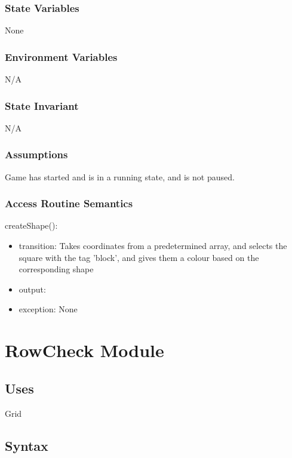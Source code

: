 \documentclass[12pt]{article}
\begin{document}
\subsubsection*{State Variables}

None

\subsubsection*{Environment Variables}

N/A

\subsubsection*{State Invariant}

N/A

\subsubsection*{Assumptions}

Game has started and is in a running state, and is not paused.

\subsubsection* {Access Routine Semantics}

\noindent createShape():
\begin{itemize}
\item transition: Takes coordinates from a predetermined array, and selects the square with the tag 'block', and gives them a colour based on the corresponding shape
\item output:
\item exception: None
\end{itemize}


\newpage

\section* {RowCheck Module}

\subsection*{Uses}

Grid

\subsection*{Syntax}
\end{document}
